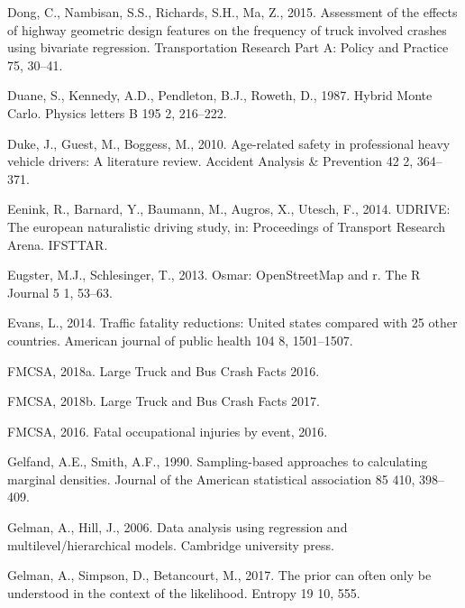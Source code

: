 \documentclass[12pt]{book}
\numberwithin{equation}{chapter}
\begin{document}
\leavevmode\hypertarget{ref-dong2015assessment}{}%
Dong, C., Nambisan, S.S., Richards, S.H., Ma, Z., 2015. Assessment of the effects of highway geometric design features on the frequency of truck involved crashes using bivariate regression. Transportation Research Part A: Policy and Practice 75, 30--41.

\leavevmode\hypertarget{ref-duane1987hybrid}{}%
Duane, S., Kennedy, A.D., Pendleton, B.J., Roweth, D., 1987. Hybrid Monte Carlo. Physics letters B 195 2, 216--222.

\leavevmode\hypertarget{ref-duke2010age}{}%
Duke, J., Guest, M., Boggess, M., 2010. Age-related safety in professional heavy vehicle drivers: A literature review. Accident Analysis \& Prevention 42 2, 364--371.

\leavevmode\hypertarget{ref-eenink2014udrive}{}%
Eenink, R., Barnard, Y., Baumann, M., Augros, X., Utesch, F., 2014. UDRIVE: The european naturalistic driving study, in: Proceedings of Transport Research Arena. IFSTTAR.

\leavevmode\hypertarget{ref-eugster2013osmar}{}%
Eugster, M.J., Schlesinger, T., 2013. Osmar: OpenStreetMap and r. The R Journal 5 1, 53--63.

\leavevmode\hypertarget{ref-evans2014traffic}{}%
Evans, L., 2014. Traffic fatality reductions: United states compared with 25 other countries. American journal of public health 104 8, 1501--1507.

\leavevmode\hypertarget{ref-fmcsareport2016}{}%
FMCSA, 2018a. Large Truck and Bus Crash Facts 2016.

\leavevmode\hypertarget{ref-fmcsareport2017}{}%
FMCSA, 2018b. Large Truck and Bus Crash Facts 2017.

\leavevmode\hypertarget{ref-fmcsafacts2016}{}%
FMCSA, 2016. Fatal occupational injuries by event, 2016.

\leavevmode\hypertarget{ref-gelfand1990sampling}{}%
Gelfand, A.E., Smith, A.F., 1990. Sampling-based approaches to calculating marginal densities. Journal of the American statistical association 85 410, 398--409.

\leavevmode\hypertarget{ref-gelman2006data}{}%
Gelman, A., Hill, J., 2006. Data analysis using regression and multilevel/hierarchical models. Cambridge university press.

\leavevmode\hypertarget{ref-gelman2017prior}{}%
Gelman, A., Simpson, D., Betancourt, M., 2017. The prior can often only be understood in the context of the likelihood. Entropy 19 10, 555.
\end{document}
